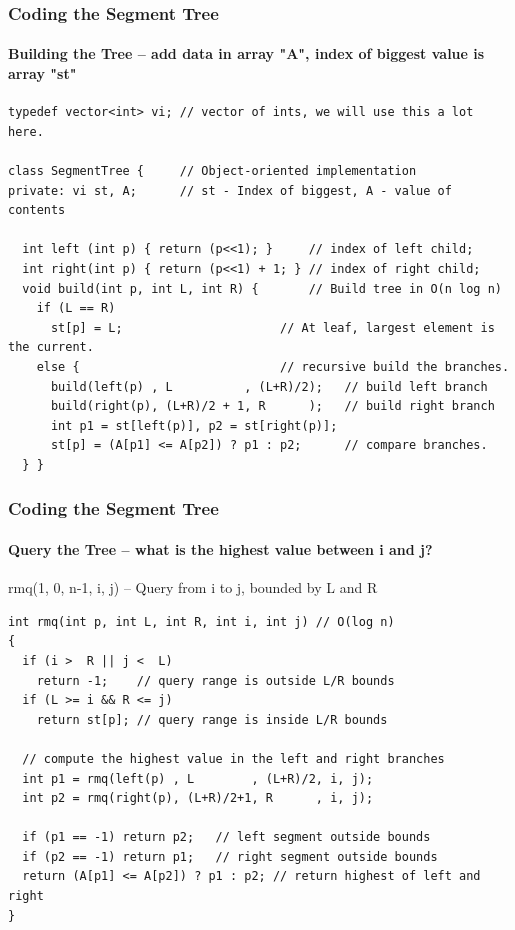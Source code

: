 \begin{frame}[fragile]
  \frametitle{Coding the Segment Tree}
  \framesubtitle{Building the Tree -- add data in array "A", index of biggest value is array "st"}
{\smaller
\begin{block}{}
\begin{verbatim}
typedef vector<int> vi; // vector of ints, we will use this a lot here.

class SegmentTree {     // Object-oriented implementation
private: vi st, A;      // st - Index of biggest, A - value of contents

  int left (int p) { return (p<<1); }     // index of left child;
  int right(int p) { return (p<<1) + 1; } // index of right child;
  void build(int p, int L, int R) {       // Build tree in O(n log n)
    if (L == R)
      st[p] = L;                      // At leaf, largest element is the current.
    else {                            // recursive build the branches.
      build(left(p) , L          , (L+R)/2);   // build left branch
      build(right(p), (L+R)/2 + 1, R      );   // build right branch
      int p1 = st[left(p)], p2 = st[right(p)];
      st[p] = (A[p1] <= A[p2]) ? p1 : p2;      // compare branches.
  } }
\end{verbatim}
\end{block}}

\end{frame}

\begin{frame}[fragile]
  \frametitle{Coding the Segment Tree}
  \framesubtitle{Query the Tree -- what is the highest value between i and j?}
{\smaller
\begin{block}{rmq(1, 0, n-1, i, j) -- Query from i to j, bounded by L and R}
\begin{verbatim}
int rmq(int p, int L, int R, int i, int j) // O(log n)
{
  if (i >  R || j <  L)
    return -1;    // query range is outside L/R bounds
  if (L >= i && R <= j)
    return st[p]; // query range is inside L/R bounds

  // compute the highest value in the left and right branches
  int p1 = rmq(left(p) , L        , (L+R)/2, i, j);
  int p2 = rmq(right(p), (L+R)/2+1, R      , i, j);

  if (p1 == -1) return p2;   // left segment outside bounds
  if (p2 == -1) return p1;   // right segment outside bounds
  return (A[p1] <= A[p2]) ? p1 : p2; // return highest of left and right
}
\end{verbatim}
\end{block}}
\end{frame}

